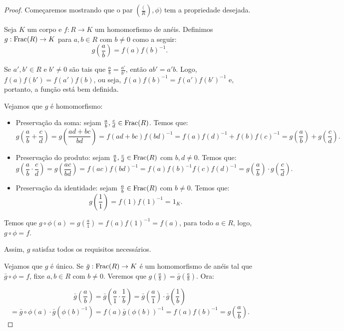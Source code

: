 \begin{proof}
    Começaremos mostrando que o par $(\frac(R), \phi)$ tem a propriedade desejada.

    Seja $K$ um corpo e $f:R\rightarrow K$ um homomorfismo de anéis.
    Definimos $g:\operatorname{Frac}(R)\rightarrow K$ para $a, b \in R$ com $b\neq 0$ como a seguir:
    \[g\left(\frac{a}{b}\right)=f(a)f(b)^{-1}.\]

    Se $a', b' \in R$ e $b'\neq 0$ são tais que $\frac{a}{b}=\frac{a'}{b'}$, então $ab'=a'b$.
    Logo, $f(a)f(b')=f(a')f(b)$, ou seja, $f(a)f(b)^{-1}=f(a')f(b')^{-1}$ e, portanto, a função está bem definida.

    Vejamos que $g$ é homomorfismo:

    \begin{itemize}
        \item Preservação da soma: sejam $\frac{a}{b}, \frac{c}{d} \in \operatorname{Frac}(R)$. Temos que:
        \[g\left(\frac{a}{b}+\frac{c}{d}\right)=g\left(\frac{ad+bc}{bd}\right)=f(ad+bc)f(bd)^{-1}=f(a)f(d)^{-1}+f(b)f(c)^{-1}=g\left(\frac{a}{b}\right)+g\left(\frac{c}{d}\right).\]
        \item Preservação do produto: sejam $\frac{a}{b}, \frac{c}{d} \in \operatorname{Frac}(R)$ com $b, d\neq 0$. Temos que:
        \[g\left(\frac{a}{b}\cdot\frac{c}{d}\right)=g\left(\frac{ac}{bd}\right)=f(ac)f(bd)^{-1}=f(a)f(b)^{-1}f(c)f(d)^{-1}=g\left(\frac{a}{b}\right)\cdot g\left(\frac{c}{d}\right).\]
        \item Preservação da identidade: sejam $\frac{a}{b} \in \operatorname{Frac}(R)$ com $b\neq 0$. Temos que:
        \[g\left(\frac{1}{1}\right)=f(1)f(1)^{-1}=1_K.\]
    \end{itemize}

    Temos que $g\circ \phi(a)=g(\frac{a}{1})=f(a)f(1)^{-1}=f(a)$, para todo $a \in R$, logo, $g\circ \phi=f$.

    Assim, $g$ satisfaz todos os requisitos necessários.

    Vejamos que $g$ é único.
    Se $\bar g:\operatorname{Frac}(R)\rightarrow K$ é um homomorfismo de anéis tal que $\bar g\circ \phi=f$, fixe $a, b \in R$ com $b\neq 0$. Veremos que $g\left(\frac{a}{b}\right)=\bar g\left(\frac{a}{b}\right)$.
    Ora:

    \[\bar g\left(\frac{a}{b}\right)=\bar g\left(\frac{a}{1}\cdot\frac{1}{b}\right)=\bar g\left(\frac{a}{1}\right)\cdot \bar g\left(\frac{1}{b}\right)\]
    \[=\bar g\circ \phi(a)\cdot \bar g(\phi(b)^{-1})=f(a)\bar g(\phi(b))^{-1}=f(a)f(b)^{-1}=g\left(\frac{a}{b}\right).\]


\end{proof}
